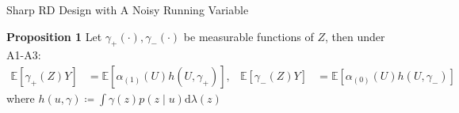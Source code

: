 \begin{frame}{Sharp RD Design with A Noisy Running Variable}
    \begin{block}{\textbf{Proposition 1}}
        \small
        Let $\gamma_{+}(\cdot),\gamma_{-}(\cdot)$ be measurable functions of $Z$, then under A1-A3:
        \begin{align*}
            \mathbb{E}\left[\gamma_{+}\left(Z\right)Y\right]&=\mathbb{E}\left[\alpha_{\left(1\right)}\left(U\right)h\left(U,\gamma_{+}\right)\right], & \mathbb{E}\left[\gamma_{-}\left(Z\right)Y\right]&=\mathbb{E}\left[\alpha_{\left(0\right)}\left(U\right)h\left(U,\gamma_{-}\right)\right]
        \end{align*}
        where $h\left(u,\gamma\right)\coloneqq\int\gamma\left(z\right)p\left(z\mid u\right)\mathrm{d}\lambda\left(z\right)$
    \end{block}

    
    
\end{frame}